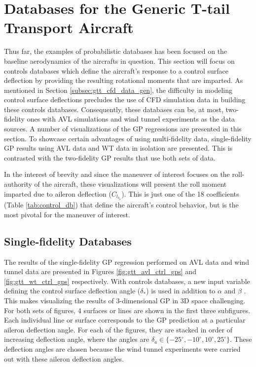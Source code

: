 \section{Databases for the Generic T-tail Transport Aircraft} \label{sec:gtt_dbs}

Thus far, the examples of probabilistic databases has been focused on the baseline aerodynamics of the aircrafts in question. 
This section will focus on controls databases which define the aircraft's response to a control surface deflection by providing the resulting rotational moments that are imparted. 
As mentioned in Section \ref{subsec:gtt_cfd_data_gen}, the difficulty in modeling control surface deflections precludes the use of CFD simulation data in building these controls databases. 
Consequently, these databases can be, at most, two-fidelity ones with AVL simulations and wind tunnel experiments as the data sources. 
A number of visualizations of the GP regressions are presented in this section.
To showcase certain advantages of using multi-fidelity data, single-fidelity GP results using AVL data and WT data in isolation are presented.
This is contrasted with the two-fidelity GP results that use both sets of data. 

In the interest of brevity and since the maneuver of interest focuses on the roll-authority of the aircraft, these visualizations will present the roll moment imparted due to aileron deflection ($C_{l_{\delta_a}}$).
This is just one of the 18 coefficients (Table \ref{tab:control_db}) that define the aircraft's control behavior, but is the most pivotal for the maneuver of interest. 

\subsection{Single-fidelity Databases}
The results of the single-fidelity GP regression performed on AVL data and wind tunnel data are presented in Figures \ref{fig:gtt_avl_ctrl_gps} and \ref{fig:gtt_wt_ctrl_gps} respectively. 
With controls databases, a new input variable defining the control surface deflection angle ($\delta_*$) is used in addition to $\alpha$ and $\beta$ .
This makes visualizing the results of 3-dimensional GP in 3D space challenging. 
For both sets of figures, 4 surfaces or lines are shown in the first three subfigures. 
Each individual line or surface corresponds to the GP prediction at a particular aileron deflection angle.
For each of the figures, they are stacked in order of increasing deflection angle, where the angles are $\delta_a \in \{-25^\circ, -10^\circ, 10^\circ, 25^\circ\}$. 
These deflection angles are chosen because the wind tunnel experiments were carried out with these aileron deflection angles. 

